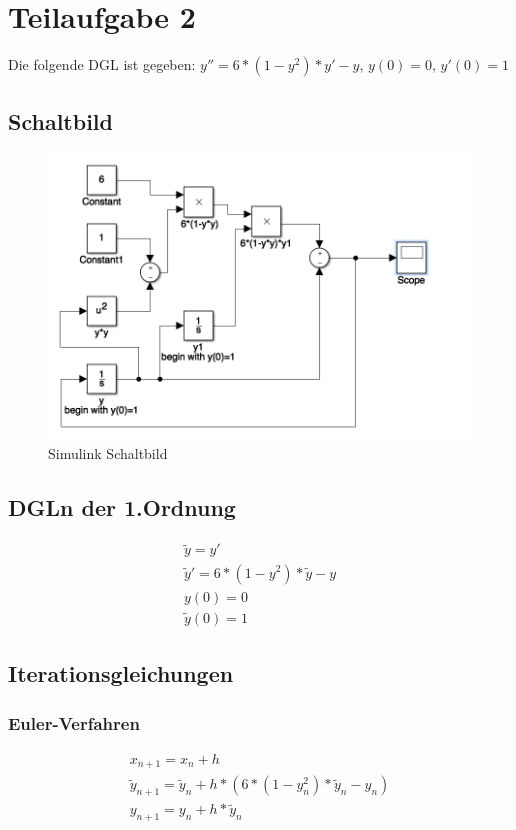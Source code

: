 \documentclass[]{scrartcl}
\begin{document}
\section{Teilaufgabe 2}
Die folgende DGL ist gegeben:
$ y'' = 6 * (1 - y^{2}) * y' - y $,
$ y(0) = 0 $,
$ y'(0) = 1 $

\subsection{Schaltbild}

\begin{figure}[htbp]
	\centering
	\includegraphics[width=1\linewidth]{a1_2_schaltbild}
	\caption{Simulink Schaltbild}
	\label{fig:a1_2_schaltbild}
\end{figure}

\subsection{DGLn der 1.Ordnung}
\begin{align}
\tilde{y} = y' \\
\tilde{y}' = 6 * (1 - y^{2}) * \tilde{y} - y \\
y(0)  = 0 \\
\tilde{y}(0) = 1
\end{align}

\subsection{Iterationsgleichungen}

\subsubsection{Euler-Verfahren}
\begin{align}
x_{n+1} = x_{n}+h \\
\tilde{y}_{n+1} = \tilde{y}_{n}+h*(6 * (1 - y_{n}^{2}) * \tilde{y}_{n} - y_{n}) \\
y_{n+1} = y_{n} + h * \tilde{y}_{n}
\end{align}
\end{document}
